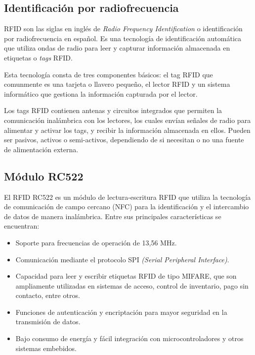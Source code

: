 \subsection{Identificación por radiofrecuencia}
\label{subsec:rfid}

RFID \cite{RFID} son las siglas en inglés de \textit{Radio Frequency Identification} o identificación por radiofrecuencia en español. Es una tecnología de identificación automática que utiliza ondas de radio para leer y capturar información almacenada en etiquetas o \textit{tags} RFID.

Esta tecnología consta de tres componentes básicos: el tag RFID que comunmente es una tarjeta o llavero pequeño, el lector RFID y un sistema informático que gestiona la información capturada por el lector. 

Los tags RFID contienen antenas y circuitos integrados que permiten la comunicación inalámbrica con los lectores, los cuales envían señales de radio para alimentar y activar los tags, y recibir la información almacenada en ellos. Pueden ser pasivos, activos o semi-activos, dependiendo de si necesitan o no una fuente de alimentación externa. 


\subsection{Módulo RC522}
\label{subsec:rc522}


El RFID RC522 \cite{MFRC522} es un módulo de lectura-escritura RFID que utiliza la tecnología de comunicación de campo cercano (NFC) para la identificación y el intercambio de datos de manera inalámbrica. Entre sus principales características se encuentran:

\begin{itemize}
\item Soporte para frecuencias de operación de 13,56 MHz.
\item Comunicación mediante el protocolo SPI \textit{(Serial Peripheral Interface)}.
\item Capacidad para leer y escribir etiquetas RFID de tipo MIFARE, que son ampliamente utilizadas en sistemas de acceso, control de inventario, pago sin contacto, entre otros.
\item Funciones de autenticación y encriptación para mayor seguridad en la transmisión de datos.
\item Bajo consumo de energía y fácil integración con microcontroladores y otros sistemas embebidos.
\end{itemize}

